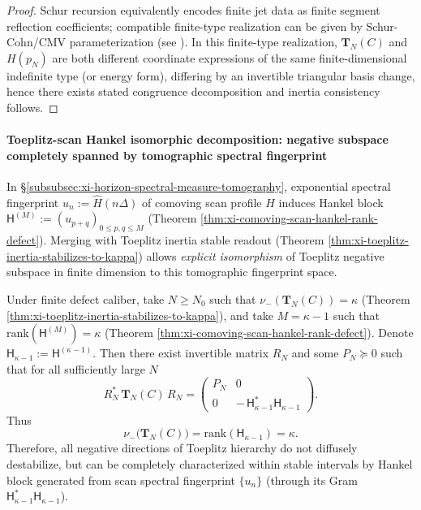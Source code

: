 \begin{proof}
Schur recursion equivalently encodes finite jet data as finite segment reflection coefficients; compatible finite-type realization can be given by Schur-Cohn/CMV parameterization (see \cite{DymYoung1990SchurCohnMatrixPolynomials,Simon2005OPUC1}).
In this finite-type realization, \(\mathbf{T}_N(C)\) and \(H(p_N)\) are both different coordinate expressions of the same finite-dimensional indefinite type (or energy form), differing by an invertible triangular basis change, hence there exists stated congruence decomposition and inertia consistency follows.
\end{proof}

\paragraph{Toeplitz-scan Hankel isomorphic decomposition: negative subspace completely spanned by tomographic spectral fingerprint}
In \S\ref{subsubsec:xi-horizon-spectral-measure-tomography}, exponential spectral fingerprint
\(
u_n:=\widehat H(n\Delta)
\)
of comoving scan profile \(H\)
induces Hankel block \(\mathsf H^{(M)}:=(u_{p+q})_{0\le p,q\le M}\) (Theorem \ref{thm:xi-comoving-scan-hankel-rank-defect}).
Merging with Toeplitz inertia stable readout (Theorem \ref{thm:xi-toeplitz-inertia-stabilizes-to-kappa}) allows \emph{explicit isomorphism} of Toeplitz negative subspace in finite dimension to this tomographic fingerprint space.

\begin{corollary}\label{cor:xi-toeplitz-scan-hankel-congruence-decomposition}
Under finite defect caliber, take \(N\ge N_0\) such that \(\nu_-(\mathbf{T}_N(C))=\kappa\) (Theorem \ref{thm:xi-toeplitz-inertia-stabilizes-to-kappa}),
and take \(M=\kappa-1\) such that \(\mathrm{rank}(\mathsf H^{(M)})=\kappa\) (Theorem \ref{thm:xi-comoving-scan-hankel-rank-defect}).
Denote \(\mathsf H_{\kappa-1}:=\mathsf H^{(\kappa-1)}\).
Then there exist invertible matrix \(R_N\) and some \(P_N\succeq 0\) such that for all sufficiently large \(N\)
\[
\boxed{\;
R_N^\ast\,\mathbf{T}_N(C)\,R_N
=
\begin{pmatrix}
P_N & 0\\[2pt]
0 & -\,\mathsf H_{\kappa-1}^{\ast}\mathsf H_{\kappa-1}
\end{pmatrix}. \;}
\]
Thus
\[
\boxed{\;
\nu_-\!\bigl(\mathbf{T}_N(C)\bigr)=\mathrm{rank}(\mathsf H_{\kappa-1})=\kappa. \;}
\]
Therefore, all negative directions of Toeplitz hierarchy do not diffusely destabilize, but can be completely characterized within stable intervals by Hankel block generated from scan spectral fingerprint \(\{u_n\}\) (through its Gram \(\mathsf H_{\kappa-1}^{\ast}\mathsf H_{\kappa-1}\)).
\end{corollary}


